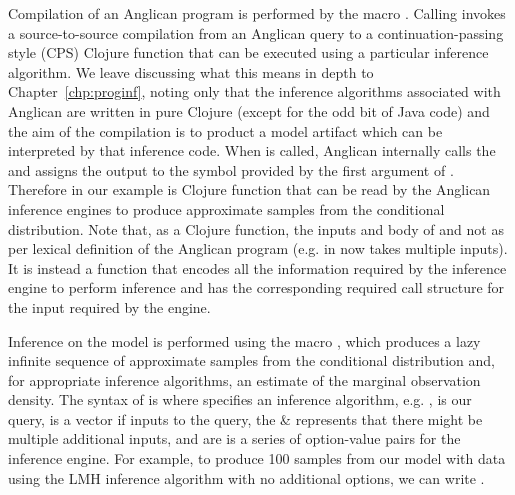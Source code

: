 Compilation of an Anglican program is performed by the macro \query.  Calling \query
invokes a source-to-source compilation from an Anglican query to a continuation-passing 
style (CPS) Clojure function that can be executed using a particular inference algorithm.  We
leave discussing what this means in depth to Chapter~\ref{chp:proginf}, noting only that
the inference algorithms associated with Anglican are written in pure Clojure (except for the odd
bit of Java code) and the aim of the compilation is to product a model artifact which can be
interpreted by that inference code.
When  is called, Anglican internally calls the \query and assigns the output to
the symbol provided by the first argument of .  Therefore {\small {}} in
our example is Clojure function that can be read by the Anglican inference engines to produce
approximate samples from the conditional distribution.  Note that, as a Clojure function, the
inputs and body of {\small {}} and not as per lexical definition of the Anglican program
(e.g. in now takes multiple inputs).  It is instead a function that encodes all the information 
required by the inference engine to perform inference and has the corresponding required call structure
for the input required by the engine.

Inference on the model is performed using the macro \doquery, which produces a lazy infinite sequence of 
approximate samples from the conditional distribution and, for appropriate inference algorithms,
 an estimate of the marginal observation density.
The syntax of \doquery is {\small {}} where {\small {}}
specifies an inference algorithm, e.g. {\small {}}, {\small {}} is our query, {\small {}}
is a vector if inputs to the query, the \& represents that there might be multiple additional inputs, and {\small {}}
are is a series of option-value pairs for the inference engine.  For example, to produce 100 samples from
our {\small {}} model with data {\small \lsi{[2.1 5.2 1.1]}} using the LMH inference algorithm with no
additional options, we can write {\small {}}.

